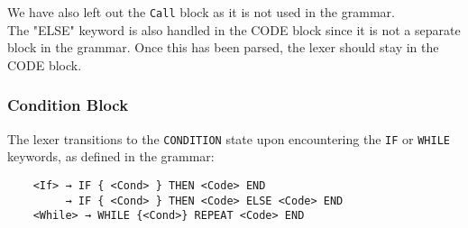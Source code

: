 	We have also left out the \texttt{Call} block as it is not used in the grammar.\\

	The "ELSE" keyword is also handled in the CODE block since it is not a separate block in the grammar. Once this has been parsed, the lexer should stay in the CODE block.\\


	\subsubsection{Condition Block}
	The lexer transitions to the \texttt{CONDITION} state upon encountering the \texttt{IF} or \texttt{WHILE} keywords, as defined in the grammar:

	\begin{verbatim}
	<If> → IF { <Cond> } THEN <Code> END
		 → IF { <Cond> } THEN <Code> ELSE <Code> END
	<While> → WHILE {<Cond>} REPEAT <Code> END
	\end{verbatim}

